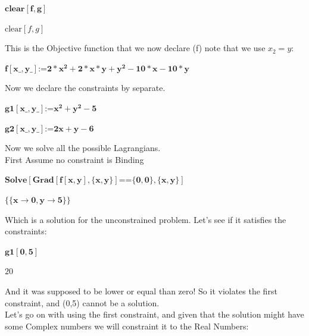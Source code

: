 


\begin{doublespace}
\noindent\(\pmb{\text{clear}[f,g]}\)
\end{doublespace}

\begin{doublespace}
\noindent\(\text{clear}[f,g]\)
\end{doublespace}

This is the Objective function that we now declare (f) note that we use $x_2=y$:

\begin{doublespace}
\noindent\(\pmb{f[\text{x$\_$},\text{y$\_$}]\text{:=}2*x^2+2*x*y+y^2-10*x-10*y}\)
\end{doublespace}

Now we declare the constraints by separate.

\begin{doublespace}
\noindent\(\pmb{\text{g1}[\text{x$\_$},\text{y$\_$}]\text{:=} x^2+y^2-5}\)
\end{doublespace}

\begin{doublespace}
\noindent\(\pmb{\text{g2}[\text{x$\_$},\text{y$\_$}]\text{:=} 2x+y-6}\)
\end{doublespace}

Now we solve all the possible Lagrangians.\\
First Assume no constraint is Binding

\begin{doublespace}
\noindent\(\pmb{\text{Solve}[\text{Grad}[f[x,y],\{x,y\}]\text{==} \{0,0\},\{x,y\}]}\)
\end{doublespace}

\begin{doublespace}
\noindent\(\pmb{\{\{x\to 0,y\to 5\}\}}\)
\end{doublespace}

Which is a solution for the unconstrained problem. Let{'}s see if it satisfies the constraints:

\begin{doublespace}
\noindent\(\pmb{\text{g1}[0,5]}\)
\end{doublespace}

\begin{doublespace}
\noindent\(20\)
\end{doublespace}

And it was supposed to be lower or equal than zero! So it violates the first constraint, and (0,5) cannot be a solution.\\
Let{'}s go on with using the first constraint, and given that the solution might have some Complex numbers we will constraint it to the Real Numbers:

